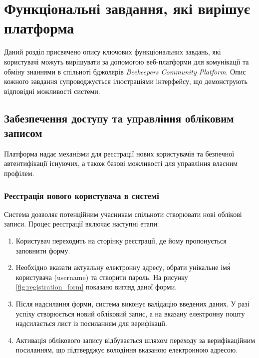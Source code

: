\chapter{Функціональні завдання, які вирішує платформа}
\label{ch:functional_tasks}

Даний розділ присвячено опису ключових функціональних завдань, які користувачі можуть вирішувати за допомогою веб-платформи для комунікації та обміну знаннями в спільноті бджолярів \textit{Beekeepers Community Platform}. Опис кожного завдання супроводжується ілюстраціями інтерфейсу, що демонструють відповідні можливості системи.

\section{Забезпечення доступу та управління обліковим записом}
\label{sec:tasks_auth}
Платформа надає механізми для реєстрації нових користувачів та безпечної автентифікації існуючих, а також базові можливості для управління власним профілем.

\subsection{Реєстрація нового користувача в системі}
\label{subsec:task_registration}
Система дозволяє потенційним учасникам спільноти створювати нові облікові записи. Процес реєстрації включає наступні етапи:
\begin{enumerate}
    \item Користувач переходить на сторінку реєстрації, де йому пропонується заповнити форму.
    \item Необхідно вказати актуальну електронну адресу, обрати унікальне ім\'я користувача (username) та створити пароль. На рисунку \ref{fig:registration_form} показано вигляд даної форми.
    \item Після надсилання форми, система виконує валідацію введених даних. У разі успіху створюється новий обліковий запис, а на вказану електронну пошту надсилається лист із посиланням для верифікації.
    \item Активація облікового запису відбувається шляхом переходу за верифікаційним посиланням, що підтверджує володіння вказаною електронною адресою.
\end{enumerate}


